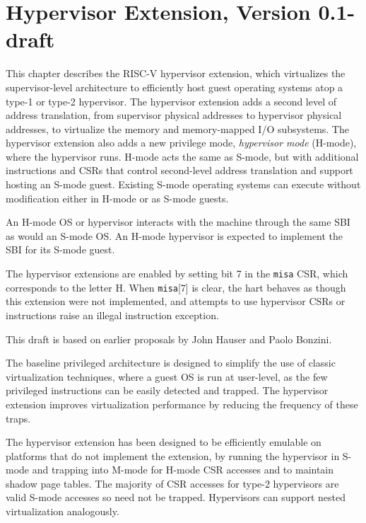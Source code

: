 \chapter{Hypervisor Extension, Version 0.1-draft}
\label{hypervisor}

This chapter describes the RISC-V hypervisor extension, which virtualizes the
supervisor-level architecture to efficiently host guest operating systems atop
a type-1 or type-2 hypervisor.  The hypervisor extension adds a second level
of address translation, from supervisor physical addresses to
hypervisor physical addresses, to virtualize the memory and memory-mapped I/O
subsystems.  The hypervisor extension also adds a new privilege mode, {\em
hypervisor mode} (H-mode), where the hypervisor runs.  H-mode acts the same as
S-mode, but with additional instructions and CSRs that control second-level
address translation and support hosting an S-mode guest.  Existing S-mode
operating systems can execute without modification either in H-mode or as
S-mode guests.

An H-mode OS or hypervisor interacts with the machine through the same SBI
as would an S-mode OS.  An H-mode hypervisor is expected to implement the
SBI for its S-mode guest.

The hypervisor extensions are enabled by setting bit 7 in the {\tt misa} CSR,
which corresponds to the letter H.  When {\tt misa}[7] is clear, the hart
behaves as though this extension were not implemented, and attempts to use
hypervisor CSRs or instructions raise an illegal instruction exception.

\begin{commentary}
This draft is based on earlier proposals by John Hauser and Paolo Bonzini.
\end{commentary}

\begin{commentary}
The baseline privileged architecture is designed to simplify the use of classic
virtualization techniques, where a guest OS is run at user-level, as
the few privileged instructions can be easily detected and trapped.
The hypervisor extension improves virtualization performance by
reducing the frequency of these traps.

The hypervisor extension has been designed to be efficiently
emulable on platforms that do not implement the extension, by running
the hypervisor in S-mode and trapping into M-mode for H-mode CSR accesses
and to maintain shadow page tables.  The majority of CSR accesses for
type-2 hypervisors are valid S-mode accesses so need not be trapped.
Hypervisors can support nested virtualization analogously.
\end{commentary}

